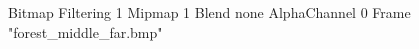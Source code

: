 {Bitmap
	{Filtering 1}
	{Mipmap 1}
	{Blend none}
	{AlphaChannel 0}
	{Frame "forest_middle_far.bmp"}
}
